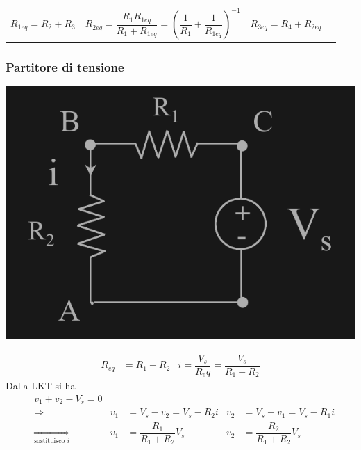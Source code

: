 \documentclass{article}
\begin{document}
\begin{center}
\begin{tabular}{c c c c}
    $R_{1eq} = R_2+R_3$
    &
    $R_{2eq} =\dfrac{R_1 R_{1eq}}{R_1+R_{1eq}} = \left( \dfrac{1}{R_1} + \dfrac{1}{R_{1eq}} \right)^{-1}$
    &
    $R_{3eq} = R_4 + R_{2eq} $
\end{tabular}
\end{center}


\subsubsection{Partitore di tensione}
\begin{center}
    \includegraphics[scale=0.23]{Image/Partitore di tensione.png}
\end{center}
\begin{align*}
    R_{eq} &= R_1+R_2 & i = \dfrac{V_s}{R_eq} = \dfrac{V_s}{R_1+R_2}
\end{align*}
Dalla LKT si ha
\begin{align*}
    &v_1+v_2 - V_s = 0\\
    &\Longrightarrow & v_1&=V_s - v_2 = V_s - R_2 i & v_2 &= V_s-v_1 = V_s - R_1 i\\
    &\underset{\text{sostituisco } i}{\Longrightarrow} & v_1&=\dfrac{R_1}{R_1+R_2} V_s & v_2&=\dfrac{R_2}{R_1+R_2} V_s
\end{align*}
\end{document}
